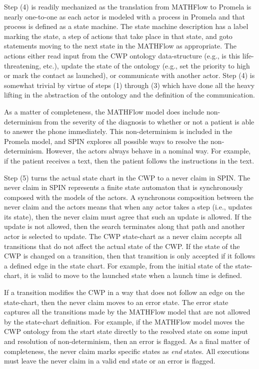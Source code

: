 Step (4) is readily mechanized as the translation from MATHFlow to
Promela is nearly one-to-one as each actor is modeled with a process
in Promela and that process is defined as a state machine. The state
machine description has a label marking the state, a step of actions
that take place in that state, and goto statements moving to the next
state in the MATHFlow as appropriate. The actions either read input
from the CWP ontology data-structure (e.g., is this life-threatening,
etc.), update the state of the ontology (e.g., set the priority to
high or mark the contact as launched), or communicate with another
actor. Step (4) is somewhat trivial by virtue of steps (1) through (3)
which have done all the heavy lifting in the abstraction of the
ontology and the definition of the communication.

As a matter of completeness, the MATHFlow model does include
non-determinism from the severity of the diagnosis to whether or not a
patient is able to answer the phone immediately. This non-determinism
is included in the Promela model, and SPIN explores all possible ways
to resolve the non-determinism. However, the actors always behave in a
nominal way. For example, if the patient receives a text, then the
patient follows the instructions in the text.

Step (5) turns the actual state chart in the CWP to a never claim in
SPIN. The never claim in SPIN represents a finite state automaton that
is synchronously composed with the models of the actors. A synchronous
composition between the never claim and the actors means that when any
actor takes a step (i.e., updates its state), then the never claim
must agree that such an update is allowed. If the update is not
allowed, then the search terminates along that path and another actor
is selected to update. The CWP state-chart as a never claim accepts
all transitions that do not affect the actual state of the CWP. If the
state of the CWP is changed on a transition, then that transition is only accepted if it
follows a defined edge in the state chart. For example, from the
initial state of the state-chart, it is valid to move to the launched
state when a launch time is defined.

If a transition modifies the CWP in a way that does not follow an edge
on the state-chart, then the never claim moves to an error state. The
error state captures all the transitions made by the MATHFlow model
that are not allowed by the state-chart definition. For example, if
the MATHFlow model moves the CWP ontology from the start state
directly to the resolved state on some input and resolution of
non-determinism, then an error is flagged. As a final matter of
completeness, the never claim marks specific states as \emph{end}
states. All executions must leave the never claim in a valid end state
or an error is flagged.


